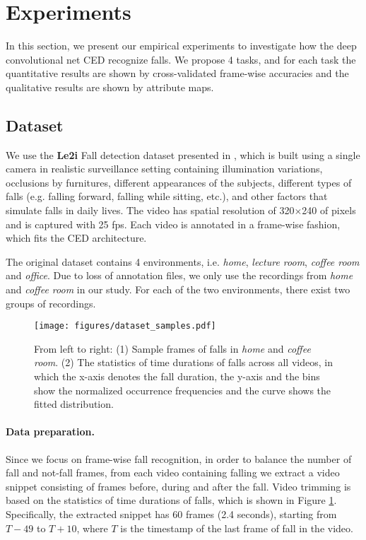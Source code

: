 \documentclass[runningheads]{llncs}
\begin{document}
\section{Experiments}
\label{sec:experiments}
In this section, we present our empirical experiments to investigate how the deep convolutional net CED recognize falls. We propose 4 tasks, and for each task the quantitative results are shown by cross-validated frame-wise accuracies and the qualitative results are shown by attribute maps. 



\subsection{Dataset}
\label{subsec:dataset}
We use the {\bf Le2i} Fall detection dataset presented in \cite{charfi2013optimized}, which is built using a single camera in realistic surveillance setting containing illumination variations, occlusions by furnitures, different appearances of the subjects, different types of falls (e.g. falling forward, falling while sitting, etc.), and other factors that simulate falls in daily lives. The video has spatial resolution of 320$\times$240 of pixels and is captured with 25 fps. Each video is annotated in a frame-wise fashion, which fits the CED architecture.  

The original dataset contains 4 environments, i.e. {\em home}, {\em lecture room}, {\em coffee room} and {\em office}. Due to loss of annotation files, we only use the recordings from {\em home} and {\em coffee room} in our study. For each of the two environments, there exist two groups of recordings.



\begin{figure}
\centering
\texttt{[image: figures/dataset\_samples.pdf]}
\caption{From left to right: (1) Sample frames of falls in {\em home} and {\em coffee room}. (2) The statistics of time durations of falls across all videos, in which the x-axis denotes the fall duration, the y-axis and the bins show the normalized occurrence frequencies and the curve shows the fitted distribution.}
\label{fig:dataset_samples}
\end{figure}


\paragraph{Data preparation.} Since we focus on frame-wise fall recognition, in order to balance the number of fall and not-fall frames, from each video containing falling we extract a video snippet consisting of frames before, during and after the fall. Video trimming is based on the statistics of time durations of falls, which is shown in Figure \ref{fig:dataset_samples}. Specifically, the extracted snippet has 60 frames (2.4 seconds), starting from $T-49$ to $T+10$, where $T$ is the timestamp of the last frame of fall in the video. 
\end{document}

